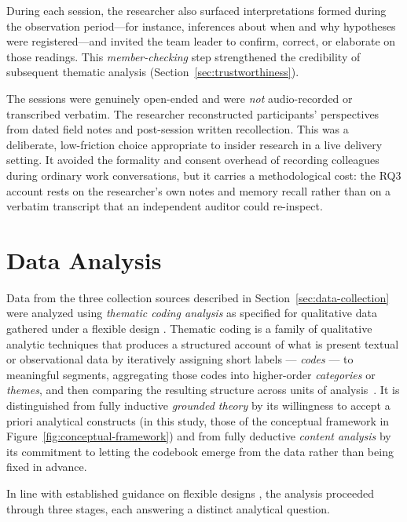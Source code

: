 During each session, the researcher also surfaced interpretations
formed during the observation period---for instance, inferences about when and
why hypotheses were registered---and invited the team leader to confirm, correct, or
elaborate on those readings. This \emph{member-checking} step strengthened the
credibility of subsequent thematic analysis (Section~\ref{sec:trustworthiness}).

The sessions were genuinely open-ended and were \emph{not} audio-recorded or
transcribed verbatim. The researcher reconstructed participants' perspectives
from dated field notes and post-session written recollection. This was a
deliberate, low-friction choice appropriate to insider research in a live
delivery setting. It avoided the formality and consent overhead of recording
colleagues during ordinary work conversations, but it carries a methodological
cost: the RQ3 account rests on the researcher's own notes and
memory recall rather than on a verbatim transcript that an independent auditor could
re-inspect.

\section{Data Analysis}
\label{sec:data-analysis}

Data from the three collection sources described in
Section~\ref{sec:data-collection} were analyzed using \emph{thematic coding
analysis} as specified for qualitative data gathered under a flexible design \citep{robson2016}. Thematic coding is a family of qualitative analytic
techniques that produces a structured account of what is present textual or observational data by iteratively assigning short labels ---
\emph{codes} --- to meaningful segments, aggregating those codes into
higher-order \emph{categories} or \emph{themes}, and then comparing the
resulting structure across units of analysis~\citep{robson2016}. It is
distinguished from fully inductive \emph{grounded theory} by its willingness
to accept a priori analytical constructs (in this study, those of the
conceptual framework in Figure~\ref{fig:conceptual-framework}) and from fully
deductive \emph{content analysis} by its commitment to letting the codebook
emerge from the data rather than being fixed in advance.

In line with established guidance on flexible designs \citep{robson2016}, the analysis proceeded
through three stages, each answering a distinct analytical question.

